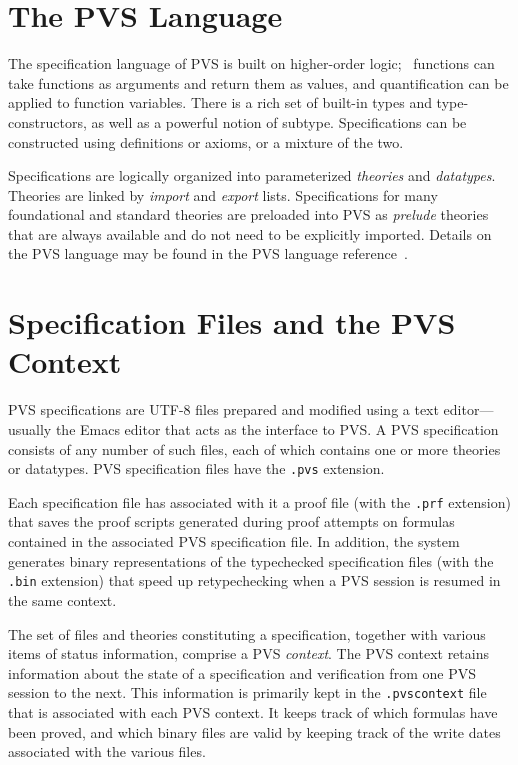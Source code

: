 \section*{The PVS Language}

The specification language of PVS is built on higher-order logic; \ie\
functions can take functions as arguments and return them as values, and
quantification can be applied to function variables.  There is a rich set
of built-in types and type-constructors, as well as a powerful notion of
subtype.  Specifications can be constructed using definitions or axioms,
or a mixture of the two.

Specifications are logically organized into parameterized
\emph{theories} and \emph{datatypes}.
Theories are linked by \emph{import} and \emph{export} lists.
Specifications for many foundational and standard theories are preloaded
into PVS as \emph{prelude}\index{prelude}\index{PVS!prelude} theories that
are always available and do not need to be explicitly imported.  Details
on the PVS language may be found in the PVS language
reference~\cite{PVS:language}.

\section*{Specification Files and the PVS Context}

PVS specifications are {\sc UTF-8} files prepared and
modified using a text editor---usually the Emacs editor that acts as the
interface to PVS.  A PVS specification consists of any number of such
files, each of which contains one or more theories or datatypes.  PVS
specification files have the \texttt{.pvs} extension.

Each specification file has associated with it a proof file (with the
\texttt{.prf} extension) that saves the proof scripts generated during
proof attempts on formulas contained in the associated PVS specification
file.
In addition, the system generates binary representations of the
typechecked specification files (with the \texttt{.bin} extension) that
speed up retypechecking when a PVS session is resumed in the same
context.

The set of files and theories constituting a specification, together with
various items of status information, comprise a PVS
\emph{context}. The PVS context retains information
about the state of a specification and verification from one PVS session
to the next.  This information is primarily kept in the
\texttt{.pvscontext} file that is associated with each PVS context.  It
keeps track of which formulas have been proved, and which binary files are
valid by keeping track of the write dates associated with the various
files.

